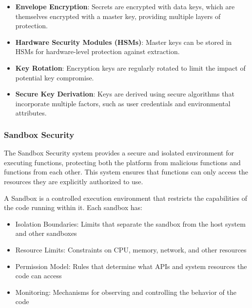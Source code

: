 \begin{itemize}
    \item \textbf{Envelope Encryption}: Secrets are encrypted with data keys, which are themselves encrypted with a master key, providing multiple layers of protection.
    
    \item \textbf{Hardware Security Modules (HSMs)}: Master keys can be stored in HSMs for hardware-level protection against extraction.
    
    \item \textbf{Key Rotation}: Encryption keys are regularly rotated to limit the impact of potential key compromise.
    
    \item \textbf{Secure Key Derivation}: Keys are derived using secure algorithms that incorporate multiple factors, such as user credentials and environmental attributes.
\end{itemize}

\subsubsection{Sandbox Security}
\label{subsubsec:sandbox}

The Sandbox Security system provides a secure and isolated environment for executing functions, protecting both the platform from malicious functions and functions from each other. This system ensures that functions can only access the resources they are explicitly authorized to use.



\begin{definition}[Sandbox]
A Sandbox is a controlled execution environment that restricts the capabilities of the code running within it. Each sandbox has:
\begin{itemize}
    \item Isolation Boundaries: Limits that separate the sandbox from the host system and other sandboxes
    \item Resource Limits: Constraints on CPU, memory, network, and other resources
    \item Permission Model: Rules that determine what APIs and system resources the code can access
    \item Monitoring: Mechanisms for observing and controlling the behavior of the code
\end{itemize}
\end{definition}

